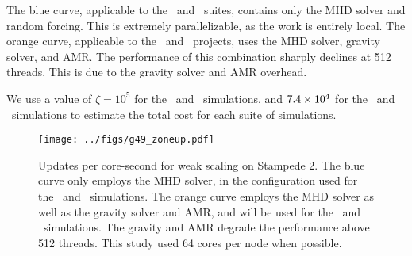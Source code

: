 \documentclass[11pt]{NSF}  %
\begin{document}
The blue curve, applicable to the \nameCMB\ and \nameTurbulence\ suites, contains only the MHD
solver and random forcing.  This is extremely parallelizable, as the work is
entirely local.  The orange curve, applicable to the \nameCores\ and
\nameGalxies\ projects,
uses the MHD solver, gravity solver, and AMR.  
The performance of this combination sharply declines at 512 threads.  
This is due to the gravity solver and AMR overhead.  

We use a value of $\zeta=10^5$ for the \nameCMB\ and \nameTurbulence\
simulations, and $7.4\times {10^{4}}$ for the \nameCores\ and \nameGalaxies\
simulations to estimate the total cost for each suite of simulations.


\begin{figure} \begin{center}
    \texttt{[image: ../figs/g49\_zoneup.pdf]}
\caption[ ]{Updates per core-second for weak scaling on
    Stampede 2.    
The blue curve only employs
    the MHD solver, in the configuration used for the \nameCMB\ and \nameTurbulence\
    simulations.  The orange curve employs the MHD solver as well as the gravity
    solver and AMR,
 and will be used for the \nameCores\ and \nameGalaxies\ simulations.  The
 gravity and AMR degrade the performance above 512 threads.  This study used 64
 cores per node when possible.}
\label{fig.scaling} \end{center} \end{figure}




\end{document}
